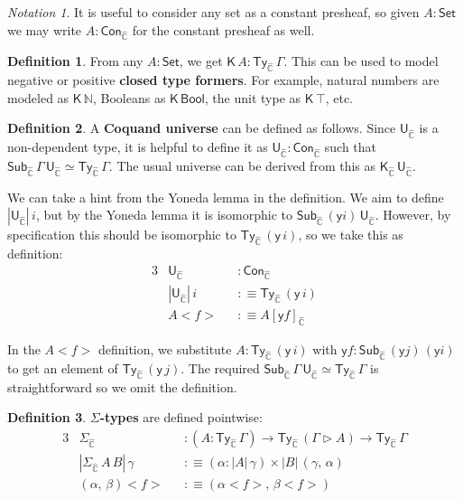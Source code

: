 \documentclass[12pt,a4paper,twoside,openany]{book}
\theoremstyle{remark}
\newtheorem{notation}{Notation}
\theoremstyle{definition}
\newtheorem{mydefinition}{Definition}
\newcommand{\ms}[1]{\mathsf{#1}}
\newcommand{\mbb}[1]{\mathbb{#1}}
\newcommand{\Con}{\mathsf{Con}}
\newcommand{\Sub}{\mathsf{Sub}}
\newcommand{\Ty}{\mathsf{Ty}}
\newcommand{\U}{\mathsf{U}}
\newcommand{\Set}{\mathsf{Set}}
\newcommand{\ext}{\triangleright}
\newcommand{\K}{\mathsf{K}}
\newcommand{\Bool}{\ms{Bool}}
\newcommand{\hmbbC}{\hat{\mbb{C}}}
\newcommand{\lab}{<\!}
\newcommand{\rab}{\!>}
\newcommand{\defn}{:\equiv}
\newcommand{\yon}{\ms{y}}
\begin{document}
\begin{notation}
It is useful to consider any set as a constant presheaf, so
given $A : \Set$ we may write $A : \Con_{\hmbbC}$ for the constant presheaf
as well.
\end{notation}

\begin{mydefinition}
From any $A : \Set$, we get $\K\,A : \Ty_{\hmbbC}\,\Gamma$. This can be used to
model negative or positive \textbf{closed type formers}. For example, natural
numbers are modeled as $\K\,\mbb{N}$, Booleans as $\K\,\Bool$, the unit type as
$\K\,\top$, etc.
\end{mydefinition}

\begin{mydefinition}
A \textbf{Coquand universe} can be defined as follows. Since $\U_{\hmbbC}$ is a
non-dependent type, it is helpful to define it as $\U_{\hmbbC} : \Con_{\hmbbC}$
such that $\Sub_{\hmbbC}\,\Gamma\,\U_{\hmbbC} \simeq \Ty_{\hmbbC}\,\Gamma$.  The
usual universe can be derived from this as $\K_{\hmbbC}\,\U_{\hmbbC}$.

We can take a hint from the Yoneda lemma in the definition. We aim to define
$|\U_{\hmbbC}|\,i$, but by the Yoneda lemma it is isomorphic to
$\Sub_{\hmbbC}\,(\yon i)\,\U_{\hmbbC}$. However, by specification this should be
isomorphic to $\Ty_{\hmbbC}\,(\yon\,i)$, so we take this as definition:
\begin{alignat*}{3}
  & \U_{\hmbbC} &&: \Con_{\hmbbC}\\
  &|\U_{\hmbbC}|\,i &&\defn \Ty_{\hmbbC}\,(\yon\,i)\\
  &A \lab f \rab &&\defn A[\yon f]_{\hmbbC}
\end{alignat*}
\end{mydefinition}
In the $A \lab f \rab$ definition, we substitute $A : \Ty_{\hmbbC}\,(\yon\,i)$
with $\yon f : \Sub_{\hmbbC}\,(\yon j)\,(\yon i)$ to get an element of
$\Ty_{\hmbbC}\,(\yon\,j)$.  The required $\Sub_{\hmbbC}\,\Gamma\,\U_{\hmbbC}
\simeq \Ty_{\hmbbC}\,\Gamma$ is straightforward so we omit the definition.

\begin{mydefinition} \textbf{$\Sigma$-types} are defined pointwise:
\begin{alignat*}{3}
  & \Sigma_{\hmbbC}  &&: (A : \Ty_{\hmbbC}\,\Gamma) \to \Ty_{\hmbbC}\,(\Gamma\ext A) \to \Ty_{\hmbbC}\,\Gamma\\    & |\Sigma_{\hmbbC}\,A\,B|\,\gamma && \defn (\alpha : |A|\,\gamma) \times |B|\,(\gamma,\,\alpha)\\
  & (\alpha,\,\beta) \lab f \rab && \defn (\alpha \lab f \rab,\, \beta \lab f \rab)
\end{alignat*}
\end{mydefinition}
\end{document}
